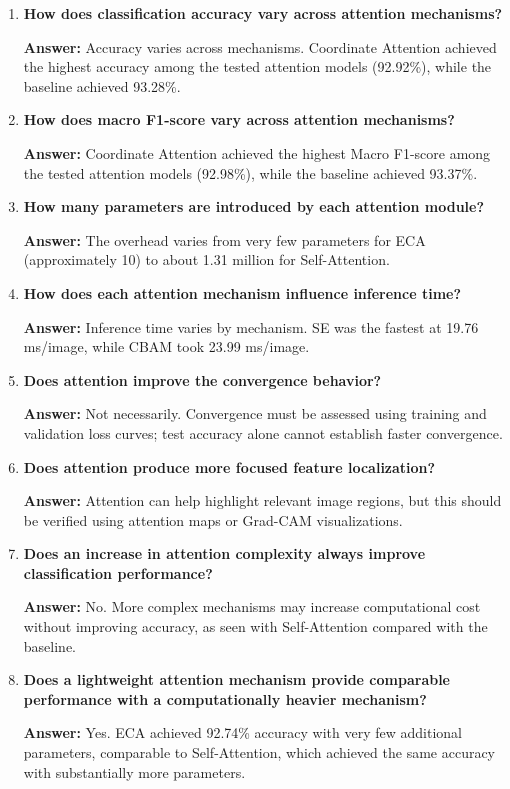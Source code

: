 \documentclass[10pt]{article}
\begin{document}
\begin{enumerate}

\item \textbf{How does classification accuracy vary across attention mechanisms?}

\textbf{Answer:} Accuracy varies across mechanisms. Coordinate Attention achieved the highest accuracy among the tested attention models (92.92\%), while the baseline achieved 93.28\%.

\item \textbf{How does macro F1-score vary across attention mechanisms?}

\textbf{Answer:} Coordinate Attention achieved the highest Macro F1-score among the tested attention models (92.98\%), while the baseline achieved 93.37\%.

\item \textbf{How many parameters are introduced by each attention module?}

\textbf{Answer:} The overhead varies from very few parameters for ECA (approximately 10) to about 1.31 million for Self-Attention.

\item \textbf{How does each attention mechanism influence inference time?}

\textbf{Answer:} Inference time varies by mechanism. SE was the fastest at 19.76 ms/image, while CBAM took 23.99 ms/image.

\item \textbf{Does attention improve the convergence behavior?}

\textbf{Answer:} Not necessarily. Convergence must be assessed using training and validation loss curves; test accuracy alone cannot establish faster convergence.

\item \textbf{Does attention produce more focused feature localization?}

\textbf{Answer:} Attention can help highlight relevant image regions, but this should be verified using attention maps or Grad-CAM visualizations.

\item \textbf{Does an increase in attention complexity always improve classification performance?}

\textbf{Answer:} No. More complex mechanisms may increase computational cost without improving accuracy, as seen with Self-Attention compared with the baseline.

\item \textbf{Does a lightweight attention mechanism provide comparable performance with a computationally heavier mechanism?}

\textbf{Answer:} Yes. ECA achieved 92.74\% accuracy with very few additional parameters, comparable to Self-Attention, which achieved the same accuracy with substantially more parameters.

\end{enumerate}
\end{document}
